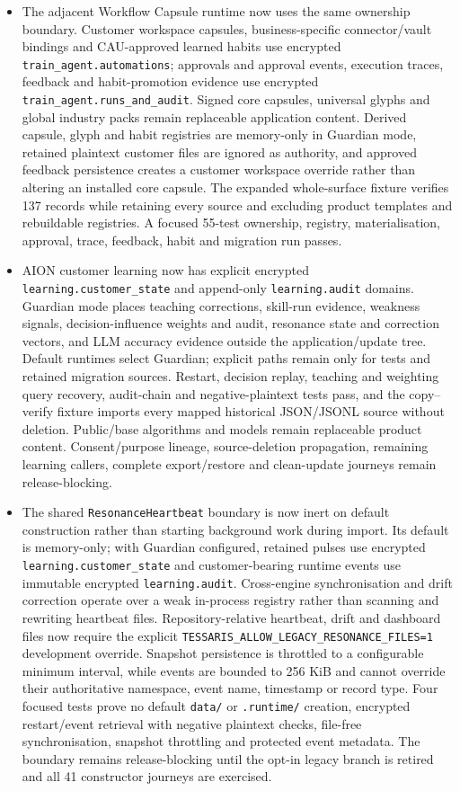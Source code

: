 \documentclass[11pt]{article}
\newcommand{\code}[1]{\texttt{#1}}
\begin{document}
\begin{itemize}
  \item The adjacent Workflow Capsule runtime now uses the same ownership boundary. Customer workspace capsules, business-specific connector/vault bindings and CAU-approved learned habits use encrypted \code{train\_agent.automations}; approvals and approval events, execution traces, feedback and habit-promotion evidence use encrypted \code{train\_agent.runs\_and\_audit}. Signed core capsules, universal glyphs and global industry packs remain replaceable application content. Derived capsule, glyph and habit registries are memory-only in Guardian mode, retained plaintext customer files are ignored as authority, and approved feedback persistence creates a customer workspace override rather than altering an installed core capsule. The expanded whole-surface fixture verifies 137 records while retaining every source and excluding product templates and rebuildable registries. A focused 55-test ownership, registry, materialisation, approval, trace, feedback, habit and migration run passes.
  \item AION customer learning now has explicit encrypted \code{learning.customer\_state} and append-only \code{learning.audit} domains. Guardian mode places teaching corrections, skill-run evidence, weakness signals, decision-influence weights and audit, resonance state and correction vectors, and LLM accuracy evidence outside the application/update tree. Default runtimes select Guardian; explicit paths remain only for tests and retained migration sources. Restart, decision replay, teaching and weighting query recovery, audit-chain and negative-plaintext tests pass, and the copy--verify fixture imports every mapped historical JSON/JSONL source without deletion. Public/base algorithms and models remain replaceable product content. Consent/purpose lineage, source-deletion propagation, remaining learning callers, complete export/restore and clean-update journeys remain release-blocking.
  \item The shared \code{ResonanceHeartbeat} boundary is now inert on default construction rather than starting background work during import. Its default is memory-only; with Guardian configured, retained pulses use encrypted \code{learning.customer\_state} and customer-bearing runtime events use immutable encrypted \code{learning.audit}. Cross-engine synchronisation and drift correction operate over a weak in-process registry rather than scanning and rewriting heartbeat files. Repository-relative heartbeat, drift and dashboard files now require the explicit \code{TESSARIS\_ALLOW\_LEGACY\_RESONANCE\_FILES=1} development override. Snapshot persistence is throttled to a configurable minimum interval, while events are bounded to 256 KiB and cannot override their authoritative namespace, event name, timestamp or record type. Four focused tests prove no default \code{data/} or \code{.runtime/} creation, encrypted restart/event retrieval with negative plaintext checks, file-free synchronisation, snapshot throttling and protected event metadata. The boundary remains release-blocking until the opt-in legacy branch is retired and all 41 constructor journeys are exercised.

\end{itemize}
\end{document}
